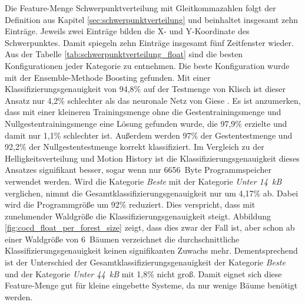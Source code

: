 Die Feature-Menge Schwerpunktverteilung mit Gleitkommazahlen folgt der Definition aus Kapitel \ref{sec:schwerpunktverteilung} und beinhaltet insgesamt zehn Einträge. Jeweils zwei Einträge bilden die X- und
Y-Koordinate des Schwerpunktes. Damit spiegeln zehn Einträge insgesamt fünf Zeitfenster wieder.
\newline
\newline
Aus der Tabelle \ref{tab:schwerpunktverteilung_float} sind die besten Konfigurationen jeder Kategorie zu entnehmen. Die beste Konfiguration wurde mit der Ensemble-Methode Boosting gefunden.
Mit einer Klassifizierungsgenauigkeit von 94,8\% auf der Testmenge von Klisch ist dieser Ansatz nur 4,2\% schlechter als das neuronale Netz von Giese \cite{gieseThesis}. Es ist anzumerken, dass mit einer
kleineren Trainingsmenge ohne die Gestentrainingsmenge und Nullgestentrainingsmenge eine Lösung gefunden wurde, die 97,9\% erzielte und damit nur 1,1\% schlechter ist.
Außerdem werden 97\% der Gestentestmenge und 92,2\% der Nullgestentestmenge korrekt klassifiziert.
\newline
\newline
Im Vergleich zu der Helligkeitsverteilung und Motion History ist die Klassifizierungsgenauigkeit dieses Ansatzes signifikant besser, sogar wenn nur 6656~Byte Programmspeicher verwendet werden.
Wird die Kategorie \textit{Beste} mit der Kategorie \textit{Unter 14~kB} verglichen, nimmt die Gesamtklassifizierungsgenauigkeit nur um 4,17\% ab. Dabei wird die Programmgröße um 92\% reduziert.
Dies verspricht, dass mit zunehmender Waldgröße die Klassifizierungsgenauigkeit steigt. Abbildung \ref{fig:cocd_float_per_forest_size} zeigt, dass dies zwar der Fall ist, aber schon ab einer Waldgröße von
6~Bäumen verzeichnet die durchschnittliche Klassifizierungsgenauigkeit keinen signifikanten Zuwachs mehr. Dementsprechend ist der Unterschied der Gesamtklassifizierungsgenauigkeit der Kategorie \textit{Beste}
und der Kategorie \textit{Unter 44~kB} mit 1,8\% nicht groß. Damit eignet sich diese Feature-Menge gut für kleine eingebette Systeme, da nur wenige Bäume benötigt werden.